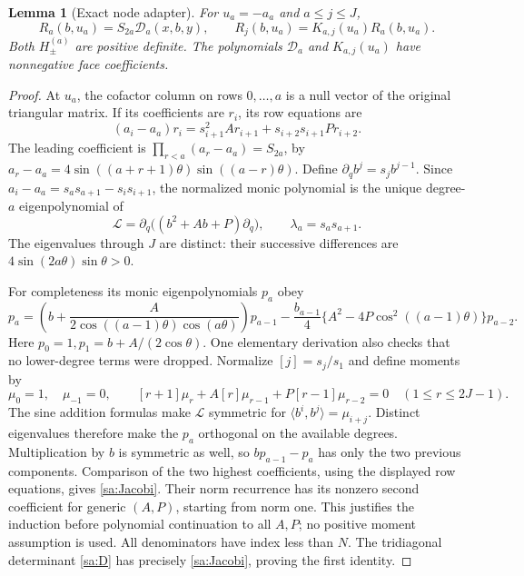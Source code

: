\documentclass[11pt]{article}
\numberwithin{equation}{section}
\newtheorem{lemma}[theorem]{Lemma}
\theoremstyle{definition}\newtheorem{definition}[theorem]{Definition}
\theoremstyle{remark}\newtheorem{remark}[theorem]{Remark}
\begin{document}
\begin{lemma}[Exact node adapter]\label{sa:node}
For $u_a=-a_a$ and $a\le j\le J$,
\begin{equation}\label{sa:node-id}
 R_a(b,u_a)=S_{2a}\mathcal D_a(x,b,y),\qquad
 R_j(b,u_a)=K_{a,j}(u_a)R_a(b,u_a).
\end{equation}
Both $H_\pm^{(a)}$ are positive definite. The polynomials
$\mathcal D_a$ and $K_{a,j}(u_a)$ have nonnegative face coefficients.
\end{lemma}
\begin{proof}
At $u_a$, the cofactor column on rows $0,\ldots,a$ is a null vector
of the original triangular matrix. If its coefficients are $r_i$, its
row equations are
\[
 (a_i-a_a)r_i=s_{i+1}^2A r_{i+1}+s_{i+2}s_{i+1}P r_{i+2}.
\]
The leading coefficient is
$\prod_{r<a}(a_r-a_a)=S_{2a}$, by
$a_r-a_a=4\sin((a+r+1)\theta)\sin((a-r)\theta)$.
Define $\partial_q b^j=s_j b^{j-1}$. Since
$a_i-a_a=s_as_{a+1}-s_is_{i+1}$, the normalized monic polynomial
is the unique degree-$a$ eigenpolynomial of
\[
 \mathcal L=\partial_q\bigl((b^2+Ab+P)\partial_q\bigr),
                     \qquad\lambda_a=s_as_{a+1}.
\]
The eigenvalues through $J$ are distinct: their successive differences
are $4\sin(2a\theta)\sin\theta>0$.

For completeness its monic eigenpolynomials $p_a$ obey
\begin{equation}\label{sa:Jacobi}
 p_a=\left(b+\frac{A}{2\cos((a-1)\theta)\cos(a\theta)}\right)p_{a-1}
       -\frac{b_{a-1}}4\{A^2-4P\cos^2((a-1)\theta)\}p_{a-2}.
\end{equation}
Here $p_0=1,p_1=b+A/(2\cos\theta)$.
One elementary derivation also checks that no lower-degree terms were
dropped. Normalize $[j]=s_j/s_1$ and define moments by
\[
 \mu_0=1,\quad\mu_{-1}=0,\qquad
 [r+1]\mu_r+A[r]\mu_{r-1}+P[r-1]\mu_{r-2}=0
                              \quad(1\le r\le2J-1).
\]
The sine addition formulas make $\mathcal L$ symmetric for
$\langle b^i,b^j\rangle=\mu_{i+j}$. Distinct eigenvalues therefore
make the $p_a$ orthogonal on the available degrees. Multiplication
by $b$ is symmetric as well, so $bp_{a-1}-p_a$ has only the two
previous components. Comparison of the two highest coefficients,
using the displayed row equations, gives \eqref{sa:Jacobi}.
Their norm recurrence has its nonzero second coefficient for generic
$(A,P)$, starting from norm one. This justifies the induction before
polynomial continuation to all $A,P$; no positive moment assumption
is used. All denominators have index less than $N$.
The tridiagonal determinant \eqref{sa:D} has precisely
\eqref{sa:Jacobi}, proving the first identity.


\end{proof}
\end{document}
